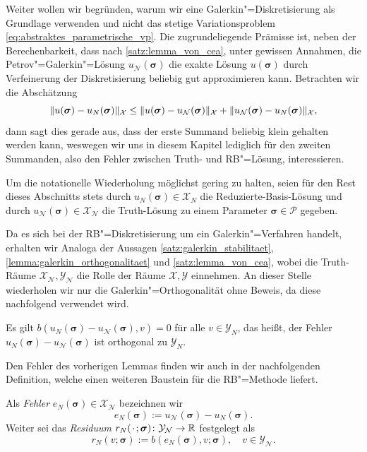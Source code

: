 \documentclass[../main.tex]{subfiles}
\begin{document}
Weiter wollen wir begründen, warum wir eine Galerkin"=Diskretisierung als Grundlage verwenden und nicht das stetige Variationsproblem \cref{eq:abstraktes_parametrische_vp}.
Die zugrundeliegende Prämisse ist, neben der Berechenbarkeit, dass nach \cref{satz:lemma_von_cea}, unter gewissen Annahmen, die Petrov"=Galerkin"=Lösung $u_{\mathcal N}(\bm \sigma)$ die exakte Lösung $u(\bm \sigma)$ durch Verfeinerung der Diskretisierung beliebig gut approximieren kann.
Betrachten wir die Abschätzung
\begin{equation}
    \lVert u(\bm \sigma) - u_{N}(\bm \sigma)\rVert_{\mathcal X} \leq \lVert u(\bm \sigma) - u_{\mathcal N}(\bm \sigma)\rVert_{\mathcal X} + \lVert u_{\mathcal N}(\bm \sigma) - u_{N}(\bm \sigma)\rVert_{\mathcal X},
\end{equation}
dann sagt dies gerade aus, dass der erste Summand beliebig klein gehalten werden kann, weswegen wir uns in diesem Kapitel lediglich für den zweiten Summanden, also den Fehler zwischen Truth- und RB"=Lösung, interessieren.

Um die notationelle Wiederholung möglichst gering zu halten, seien für den Rest dieses Abschnitts stets durch $u_{N}(\bm \sigma) \in \mathcal X_{N}$ die Reduzierte-Basis-Lösung und durch $u_{\mathcal N}(\bm \sigma) \in \mathcal X_{\mathcal N}$ die Truth-Lösung zu einem Parameter $\bm \sigma \in \mathcal P$ gegeben.

Da es sich bei der RB"=Diskretisierung um ein Galerkin"=Verfahren handelt, erhalten wir Analoga der Aussagen \cref{satz:galerkin_stabilitaet}, \cref{lemma:galerkin_orthogonalitaet} und \cref{satz:lemma_von_cea}, wobei die Truth-Räume $\mathcal X_{\mathcal N}, \mathcal Y_{\mathcal N}$ die Rolle der Räume $\mathcal X, \mathcal Y$ einnehmen.
An dieser Stelle wiederholen wir nur die Galerkin"=Orthogonalität ohne Beweis, da diese nachfolgend verwendet wird.

\begin{Lemma}
    \label{lemma:rb_galerkin_orthogonalitaet}
    Es gilt $b(u_{N}(\bm \sigma) - u_{\mathcal N}(\bm \sigma), v) = 0$ für alle $v \in \mathcal Y_{N}$, das heißt, der Fehler $u_{N}(\bm \sigma) - u_{\mathcal N}(\bm \sigma)$ ist orthogonal zu $\mathcal Y_{N}$.
\end{Lemma}

Den Fehler des vorherigen Lemmas finden wir auch in der nachfolgenden Definition, welche einen weiteren Baustein für die RB"=Methode liefert.

\begin{Definition}
\label{definition:rbm_fehler_und_residuum}
    Als \emph{Fehler} $e_{N}(\bm \sigma) \in \mathcal X_{\mathcal N}$ bezeichnen wir
    \begin{equation}
        e_{N}(\bm \sigma) := u_{\mathcal N}(\bm \sigma) - u_{N}(\bm \sigma).
    \end{equation}
    Weiter sei das \emph{Residuum} $r_{N}({\mkern2mu\cdot\mkern2mu}; \bm \sigma) \colon \mathcal Y_{\mathcal N} \to \mathbb{R}$ festgelegt als
    \begin{equation}
    \label{eq:variationsproblem_residuum}
        r_{N}(v; \bm \sigma) := b(e_{N}(\bm \sigma), v; \bm \sigma), \quad v \in \mathcal Y_{\mathcal N}.
    \end{equation}
\end{Definition}
\end{document}

